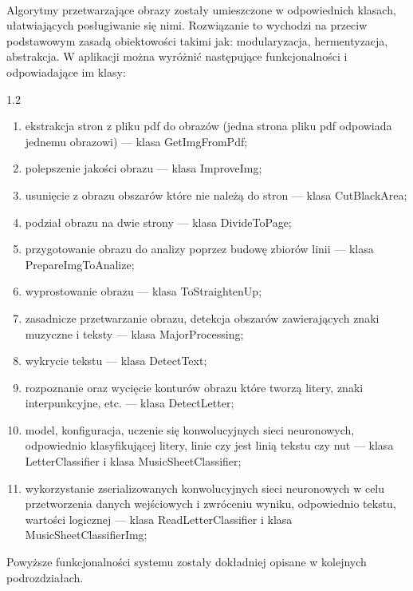 \documentclass[a4paper,12pt]{article}
\newcommand\spacingInSolemnItemize{1.2}
\begin{document}
		\paragraph{\indent} Algorytmy  przetwarzające obrazy zostały umieszczone w odpowiednich klasach, ułatwiających posługiwanie się nimi. Rozwiązanie to wychodzi na przeciw podstawowym zasadą obiektowości takimi jak: modularyzacja, hermentyzacja, abstrakcja. W aplikacji można wyróżnić następujące funkcjonalności i odpowiadające im klasy:
		\begin{spacing}{\spacingInSolemnItemize}
    		\begin{enumerate}
    			\item ekstrakcja stron z pliku pdf do obrazów (jedna strona pliku pdf odpowiada jednemu obrazowi) --- klasa GetImgFromPdf;
    			\item polepszenie jakości obrazu --- klasa ImproveImg;
    			\item usunięcie z obrazu obszarów które nie należą do stron --- klasa CutBlackArea;
    			\item podział obrazu na dwie strony --- klasa DivideToPage;
    			\item przygotowanie obrazu do analizy poprzez budowę zbiorów linii --- klasa PrepareImgToAnalize;
    			\item wyprostowanie obrazu --- klasa ToStraightenUp;
    			\item zasadnicze przetwarzanie obrazu, detekcja obszarów zawierających znaki muzyczne i teksty --- klasa MajorProcessing; 
    			\item wykrycie tekstu --- klasa DetectText;
    			\item rozpoznanie oraz wycięcie konturów obrazu które tworzą litery, znaki interpunkcyjne, etc. --- klasa DetectLetter;
    			\item  model, konfiguracja, uczenie się konwolucyjnych sieci neuronowych, odpowiednio klasyfikującej litery, linie czy jest linią tekstu czy nut --- klasa LetterClassifier i klasa MusicSheetClassifier;
    			\item wykorzystanie zserializowanych konwolucyjnych sieci neuronowych w celu przetworzenia danych wejściowych i zwróceniu wyniku, odpowiednio tekstu, wartości logicznej --- klasa ReadLetterClassifier i klasa MusicSheetClassifierImg;
    		\end{enumerate} 
        \end{spacing}
    
        \par Powyższe funkcjonalności systemu zostały dokładniej opisane w kolejnych podrozdziałach.
\end{document}
